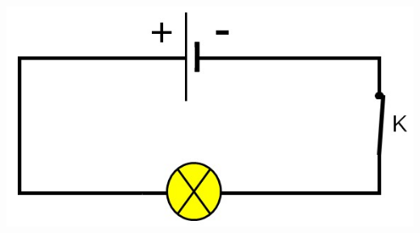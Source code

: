 \documentclass[12pt,a4paper]{article}
\begin{document}
\begin{multicols}{2}
\begin{center}
	\includegraphics[scale=0.5]{img/schema}
\end{center}

\end{multicols}

\newpage
\end{document}
